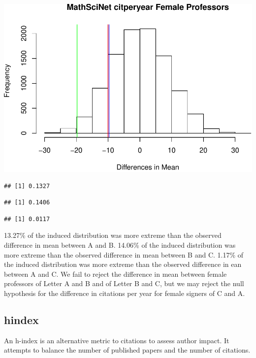 \documentclass[]{article}
\begin{document}
\includegraphics{final_files/figure-latex/unnamed-chunk-43-1.pdf}

\begin{verbatim}
## [1] 0.1327
\end{verbatim}

\begin{verbatim}
## [1] 0.1406
\end{verbatim}

\begin{verbatim}
## [1] 0.0117
\end{verbatim}

13.27\% of the induced distribution was more extreme than the observed
difference in mean between A and B. 14.06\% of the induced distribution
was more extreme than the observed difference in mean between B and C.
1.17\% of the induced distribution was more extreme than the observed
difference in ean between A and C. We fail to reject the difference in
mean between female professors of Letter A and B and of Letter B and C,
but we may reject the null hypothesis for the difference in citations
per year for female signers of C and A.

\hypertarget{hindex}{%
\subsection{hindex}\label{hindex}}

An h-index is an alternative metric to citations to assess author
impact. It attempts to balance the number of published papers and the
number of citations.
\end{document}
